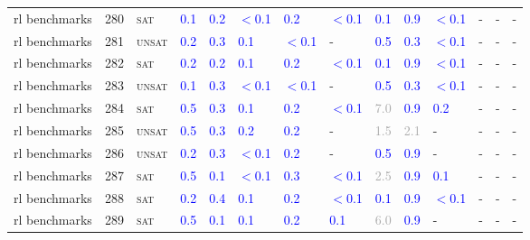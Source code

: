 \begin{center}
{\begin{longtable}{@{}llllllllllllll@{}}
rl benchmarks & 280 & \textsc{sat} & \textcolor{blue}{0.1} & \textcolor{blue}{0.2} & \textcolor{blue}{$<$0.1} & \textcolor{blue}{0.2} & \textcolor{blue}{$<$0.1} & \textcolor{blue}{0.1} & \textcolor{blue}{0.9} & \textcolor{blue}{$<$0.1} & - & - & - \\
rl benchmarks & 281 & \textsc{unsat} & \textcolor{blue}{0.2} & \textcolor{blue}{0.3} & \textcolor{blue}{0.1} & \textcolor{blue}{$<$0.1} & - & \textcolor{blue}{0.5} & \textcolor{blue}{0.3} & \textcolor{blue}{$<$0.1} & - & - & - \\
rl benchmarks & 282 & \textsc{sat} & \textcolor{blue}{0.2} & \textcolor{blue}{0.2} & \textcolor{blue}{0.1} & \textcolor{blue}{0.2} & \textcolor{blue}{$<$0.1} & \textcolor{blue}{0.1} & \textcolor{blue}{0.9} & \textcolor{blue}{$<$0.1} & - & - & - \\
rl benchmarks & 283 & \textsc{unsat} & \textcolor{blue}{0.1} & \textcolor{blue}{0.3} & \textcolor{blue}{$<$0.1} & \textcolor{blue}{$<$0.1} & - & \textcolor{blue}{0.5} & \textcolor{blue}{0.3} & \textcolor{blue}{$<$0.1} & - & - & - \\
rl benchmarks & 284 & \textsc{sat} & \textcolor{blue}{0.5} & \textcolor{blue}{0.3} & \textcolor{blue}{0.1} & \textcolor{blue}{0.2} & \textcolor{blue}{$<$0.1} & \textcolor{darkgray}{7.0} & \textcolor{blue}{0.9} & \textcolor{blue}{0.2} & - & - & - \\
rl benchmarks & 285 & \textsc{unsat} & \textcolor{blue}{0.5} & \textcolor{blue}{0.3} & \textcolor{blue}{0.2} & \textcolor{blue}{0.2} & - & \textcolor{darkgray}{1.5} & \textcolor{darkgray}{2.1} & - & - & - & - \\
rl benchmarks & 286 & \textsc{unsat} & \textcolor{blue}{0.2} & \textcolor{blue}{0.3} & \textcolor{blue}{$<$0.1} & \textcolor{blue}{0.2} & - & \textcolor{blue}{0.5} & \textcolor{blue}{0.9} & - & - & - & - \\
rl benchmarks & 287 & \textsc{sat} & \textcolor{blue}{0.5} & \textcolor{blue}{0.1} & \textcolor{blue}{$<$0.1} & \textcolor{blue}{0.3} & \textcolor{blue}{$<$0.1} & \textcolor{darkgray}{2.5} & \textcolor{blue}{0.9} & \textcolor{blue}{0.1} & - & - & - \\
rl benchmarks & 288 & \textsc{sat} & \textcolor{blue}{0.2} & \textcolor{blue}{0.4} & \textcolor{blue}{0.1} & \textcolor{blue}{0.2} & \textcolor{blue}{$<$0.1} & \textcolor{blue}{0.1} & \textcolor{blue}{0.9} & \textcolor{blue}{$<$0.1} & - & - & - \\
rl benchmarks & 289 & \textsc{sat} & \textcolor{blue}{0.5} & \textcolor{blue}{0.1} & \textcolor{blue}{0.1} & \textcolor{blue}{0.2} & \textcolor{blue}{0.1} & \textcolor{darkgray}{6.0} & \textcolor{blue}{0.9} & - & - & - & - \\

\end{longtable}}
\end{center}
